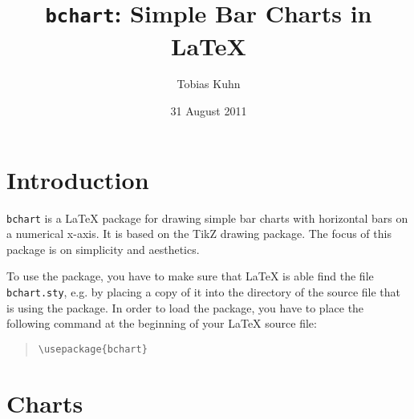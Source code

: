 \documentclass{article}
\title{\texttt{bchart}: Simple Bar Charts in \LaTeX}
\author{Tobias Kuhn}
\date{31 August 2011}
\begin{document}
\maketitle


\section{Introduction}

\texttt{bchart} is a {\LaTeX} package for drawing simple bar charts with horizontal bars on a numerical x-axis. It is based on the TikZ drawing package. The focus of this package is on simplicity and aesthetics.

To use the package, you have to make sure that {\LaTeX} is able find the file \texttt{bchart.sty}, e.g. by placing a copy of it into the directory of the source file that is using the package. In order to load the package, you have to place the following command at the beginning of your {\LaTeX} source file:
\begin{quote}\small
\begin{verbatim}
\usepackage{bchart}
\end{verbatim}
\end{quote}


\section{Charts}
\end{document}
